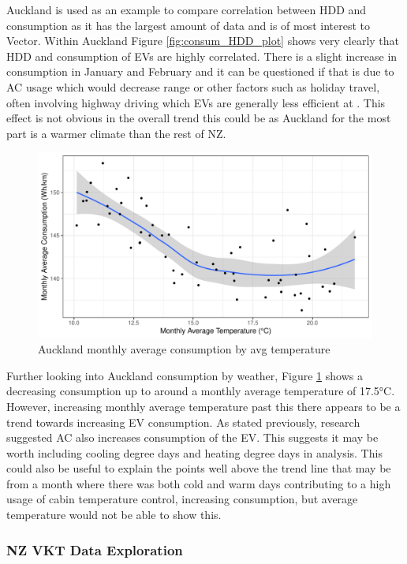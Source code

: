 \documentclass[
]{article}
\begin{document}
Auckland is used as an example to compare correlation between HDD and
consumption as it has the largest amount of data and is of most interest
to Vector. Within Auckland Figure \ref{fig:consum_HDD_plot} shows very
clearly that HDD and consumption of EVs are highly correlated. There is
a slight increase in consumption in January and February and it can be
questioned if that is due to AC usage which would decrease range
\cite{ev_range} or other factors such as holiday travel, often involving
highway driving which EVs are generally less efficient at
\cite{ev_highway}. This effect is not obvious in the overall trend this
could be as Auckland for the most part is a warmer climate than the rest
of NZ.

\begin{figure}
\centering
\includegraphics{final_report_files/figure-latex/temp_consum_plot-1.pdf}
\caption{Auckland monthly average consumption by avg
temperature\label{fig:temp_consum_plot}}
\end{figure}

Further looking into Auckland consumption by weather, Figure
\ref{fig:temp_consum_plot} shows a decreasing consumption up to around a
monthly average temperature of 17.5°C. However, increasing monthly
average temperature past this there appears to be a trend towards
increasing EV consumption. As stated previously, research
\cite{ev_range} suggested AC also increases consumption of the EV. This
suggests it may be worth including cooling degree days and heating
degree days in analysis. This could also be useful to explain the points
well above the trend line that may be from a month where there was both
cold and warm days contributing to a high usage of cabin temperature
control, increasing consumption, but average temperature would not be
able to show this.

\hypertarget{nz-vkt-data-exploration}{%
\subsubsection{NZ VKT Data Exploration}\label{nz-vkt-data-exploration}}
\end{document}
